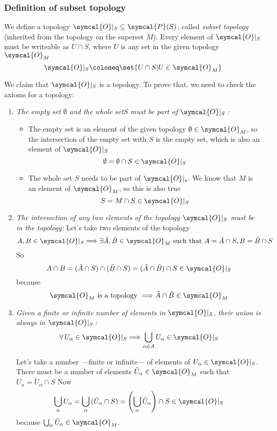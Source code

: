  \subsubsection{Definition of subset topology}
 We define a topology $\symcal{O}|_S \subseteq \symcal{P} (S)$, called \emph{subset topology}
 (inherited from the topology on the superset $M$).
 Every element of $\symcal{O}|_S$ must be writeable as $U\cap S$, where $U$ is any set in the
 given topology $\symcal{O}_M$
 \[
   \symcal{O}|_S \coloneq \set{U\cap S | U\in\symcal{O}_M}
 \]
 
 We claim that $\symcal{O}|_S$ is a topology. To prove that, we need to check the axioms for
 a topology:
 \begin{enumerate}
 \item \emph{The empty set $\emptyset$ and the whole set$S$ must be part of $\symcal{O}|_S$\,:}
   \begin{itemize}
   \item The empty set is an element of the given topology $\emptyset\in\symcal{O}_M$, so
     the intersection of the empty set with $S$ is the empty set, which is also an element
     of $\symcal{O}|_S$
   \[
     \emptyset = \emptyset\cap S \in \symcal{O}|_S
   \]

 \item The whole set $S$ needs to be part of $\symcal{O}|_s$. We know that $M$ is an element
   of $\symcal{O}_M$, so this is also true
   \[
     S = M\cap S \in \symcal{O}|_S
   \]
   \end{itemize}

 \item \emph {The intersection of any two elements of the topology} $\symcal{O}|_S$
   \emph{must be in the topology:}
   Let's take two elements of the topology
   \[
     A, B\in\symcal{O}|_S
     \Longrightarrow
     \exists \tilde{A}, \tilde{B}\in\symcal{O}_M
     \text{ such that }
     A = \tilde{A}\cap S, B = \tilde{B}\cap S
   \]
   So
   \[
     A\cap B = (\tilde{A}\cap S) \cap (\tilde{B}\cap S)
     = (\tilde{A}\cap\tilde{B})\cap S \in\symcal{O}|_S
   \]
   because
   \[
     \symcal{O}_M \text{ is a topology } \Longrightarrow \tilde{A}\cap\tilde{B}\in \symcal{O}_M
   \]

 \item \emph{Given a finite or infinite number of elements in} $\symcal{O}|_S$,
   \emph{their union is always in $\symcal{O}|_S$\,:}
   \begin{equation}
     \forall\, U_\alpha \in \symcal{O}|_S
     \Longrightarrow
     \bigcup_{\alpha\in A} U_\alpha \in \symcal{O}|_S
   \end{equation}

   Let's take a number ---finite or infinite--- of elements of $U_\alpha\in\symcal{O}|_S$.
   There must be a number of elements $\tilde{U}_\alpha\in\symcal{O}_M$ such that
   $U_\alpha = \tilde{U}_\alpha \cap S$
   Now
   \[
     \bigcup_\alpha U_\alpha
     = \bigcup_\alpha \,(\tilde{U}_\alpha\cap S)
     = \left(\bigcup_\alpha \tilde{U}_\alpha\right) \cap S\in\symcal{O}|_S
   \]
   because $\bigcup_\alpha \tilde{U}_\alpha\in\symcal{O}_M$.
 \end{enumerate}

